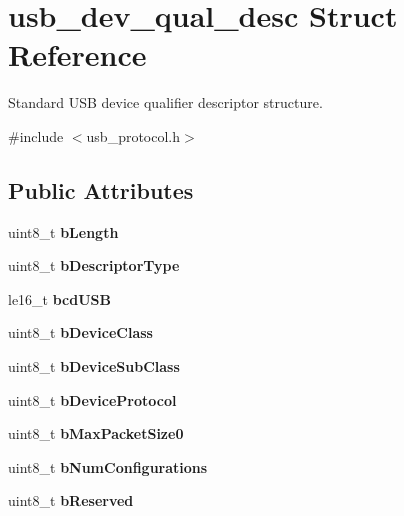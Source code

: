 \hypertarget{structusb__dev__qual__desc}{}\section{usb\+\_\+dev\+\_\+qual\+\_\+desc Struct Reference}
\label{structusb__dev__qual__desc}


Standard U\+SB device qualifier descriptor structure.  




{\ttfamily \#include $<$usb\+\_\+protocol.\+h$>$}

\subsection*{Public Attributes}
\begin{DoxyCompactItemize}
\item 
\mbox{\label{structusb__dev__qual__desc_a18d5e3ff651e95bf99b8d33f3493e92f}} 
uint8\+\_\+t {\bfseries b\+Length}
\item 
\mbox{\label{structusb__dev__qual__desc_a5b84c1981fb64fdc3d1db51917ef6f34}} 
uint8\+\_\+t {\bfseries b\+Descriptor\+Type}
\item 
\mbox{\label{structusb__dev__qual__desc_aeec02798e93014c76cc36cf90e88fb40}} 
le16\+\_\+t {\bfseries bcd\+U\+SB}
\item 
\mbox{\label{structusb__dev__qual__desc_ab02b233c356370c092b997a816812d1b}} 
uint8\+\_\+t {\bfseries b\+Device\+Class}
\item 
\mbox{\label{structusb__dev__qual__desc_aed406464ff8facc77c4689653c04ea54}} 
uint8\+\_\+t {\bfseries b\+Device\+Sub\+Class}
\item 
\mbox{\label{structusb__dev__qual__desc_a79b295f21654092b25f84c39331b2617}} 
uint8\+\_\+t {\bfseries b\+Device\+Protocol}
\item 
\mbox{\label{structusb__dev__qual__desc_a5087e660192981b01bfea1220ce96d6a}} 
uint8\+\_\+t {\bfseries b\+Max\+Packet\+Size0}
\item 
\mbox{\label{structusb__dev__qual__desc_ad45e2ee53174dc97fc95a6812d5f194f}} 
uint8\+\_\+t {\bfseries b\+Num\+Configurations}
\item 
\mbox{\label{structusb__dev__qual__desc_a2d0ef5fcd1b91e1e41a08a60756cfd1e}} 
uint8\+\_\+t {\bfseries b\+Reserved}
\end{DoxyCompactItemize}



